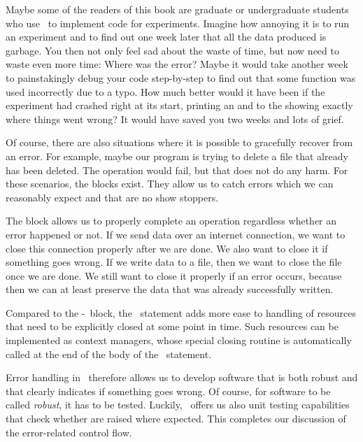 Maybe some of the readers of this book are graduate or undergraduate students who use \python\ to implement code for experiments.
Imagine how annoying it is to run an experiment and to find out one week later that all the data produced is garbage.
You then not only feel sad about the waste of time, but now need to waste even more time:
Where was the error?
Maybe it would take another week to painstakingly debug your code step-by-step to find out that some function was used incorrectly due to a typo.
How much better would it have been if the experiment had crashed right at its start, printing an  and  to the  showing exactly where things went wrong?
It would have saved you two weeks and lots of grief.

Of course, there are also situations where it is possible to gracefully recover from an error.
For example, maybe our program is trying to delete a file that already has been deleted.
The operation would fail, but that does not do any harm.
For these scenarios, the  blocks exist.
They allow us to catch errors which we can reasonably expect and that are no show stoppers.

The  block allows us to properly complete an operation regardless whether an error happened or not.
If we send data over an internet connection, we want to close this connection properly after we are done.
We also want to close it if something goes wrong.
If we write data to a file, then we want to close the file once we are done.
We still want to close it properly if an error occurs, because then we can at least preserve the data that was already successfully written.

Compared to the -~block, the ~statement adds more ease to handling of resources that need to be explicitly closed at some point in time.
Such resources can be implemented as context managers, whose special closing routine is automatically called at the end of the body of the ~statement.

Error handling in \python\ therefore allows us to develop software that is both robust and that clearly indicates if something goes wrong.
Of course, for software to be called \emph{robust}, it has to be tested.
Luckily, \pytest\ offers us also unit testing capabilities that check whether  are raised where expected.
This completes our discussion of the error-related control flow.%
\endhsection%
%
\FloatBarrier%
\endhsection%
%
